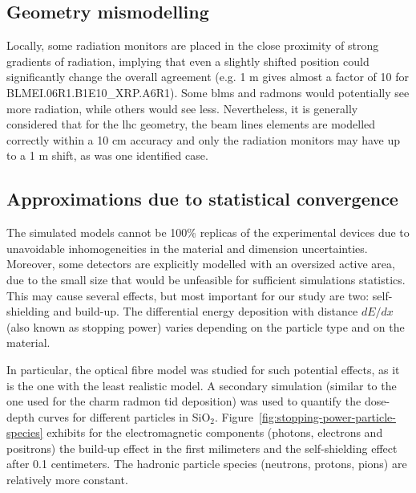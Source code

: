 \documentclass[encoding=utf8,british]{tumphthesis}
\begin{document}
\subsection{Geometry mismodelling}

Locally, some radiation monitors are placed in the close proximity of strong gradients of radiation, implying that even a slightly shifted position could significantly change the overall agreement (e.g. 1 m gives almost a factor of 10 for BLMEI.06R1.B1E10\_XRP.A6R1). Some \acrshort{blm}s and \acrshort{radmon}s would potentially see more radiation, while others would see less. Nevertheless, it is generally considered that for the \acrshort{lhc} geometry, the beam lines elements are modelled correctly within a 10 cm accuracy and only the radiation monitors may have up to a 1 m shift, as was one identified case.


\subsection{Approximations due to statistical convergence}
\label{section:approximations-due-to-statistical-convergence}

The simulated models cannot be 100\% replicas of the experimental devices due to unavoidable inhomogeneities in the material and dimension uncertainties. Moreover, some detectors are explicitly modelled with an oversized active area, due to the small size that would be unfeasible for sufficient simulations statistics. This may cause several effects, but most important for our study are two: self-shielding and build-up. The differential energy deposition with distance $dE/dx$ (also known as stopping power) varies depending on the particle type and on the material.

In particular, the optical fibre model was studied for such potential effects, as it is the one with the least realistic model. A secondary simulation (similar to the one used for the \acrshort{charm} \acrshort{radmon} \acrshort{tid} deposition) was used to quantify the dose-depth curves for different particles in SiO$_2$. Figure~\ref{fig:stopping-power-particle-species} exhibits for the electromagnetic components (photons, electrons and positrons) the build-up effect in the first milimeters and the self-shielding effect after 0.1 centimeters. The hadronic particle species (neutrons, protons, pions) are relatively more constant.
\end{document}
